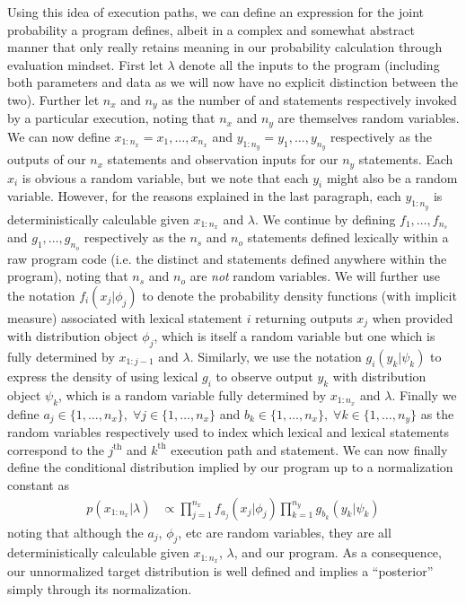 Using this idea of execution paths, we can define an expression for the joint probability a program defines,
albeit in a complex and somewhat abstract manner that only really retains meaning in our probability calculation through
evaluation mindset.  First let $\lambda$ denote all the inputs to the program (including both parameters and
data as we will now have no explicit distinction between the two).  Further let
$n_x$ and $n_y$ as the number of \sample and \observe statements
respectively invoked by a particular execution, noting that $n_x$ and $n_y$ are themselves random variables.
We can now define $x_{1:n_x} = x_1,\dots,x_{n_x}$ and $y_{1:n_y} = y_1,\dots,y_{n_y}$ respectively as the
outputs of our $n_x$ \sample statements and observation inputs for our $n_y$ \observe statements.
Each $x_{i}$ is obvious a random variable, but we note that each $y_i$ might also be a random variable.  However,
for the reasons explained in the last paragraph, each $y_{1:n_y}$ is deterministically calculable given $x_{1:n_x}$ and
$\lambda$.
We continue by defining $f_{1},\dots,f_{n_s}$ and $g_{1},\dots,g_{n_o}$ respectively as the $n_s$ \sample 
and $n_o$ \observe statements defined lexically within a raw program code (i.e. the distinct \sample and \observe
statements defined anywhere within the program), noting that $n_s$ and $n_o$ are \emph{not} random variables.
We will further use the notation $f_i(x_j|\phi_j)$  to denote the probability density functions
(with implicit measure) associated with lexical \sample statement $i$ returning outputs $x_j$ when provided
with distribution object $\phi_j$, which is itself a random variable but one which is fully determined by
$x_{1:j-1}$ and $\lambda$.  Similarly, we use the notation $g_i(y_k|\psi_k)$ to express the density of
using lexical \observe $g_i$ to observe output $y_k$ with distribution object $\psi_k$, which is a random
variable fully determined by $x_{1:n_x}$ and $\lambda$.  Finally we define $a_j \in \{1,\dots,n_x\}, \; 
\forall j\in\{1,\dots,n_x\}$ and $b_k \in \{1,\dots,n_x\}, \; \forall k\in\{1,\dots,n_y\}$ as the
random variables respectively used to index which lexical \sample and lexical \observe statements
correspond to the $j^{\text{th}}$ and $k^{\text{th}}$ execution path \sample and \observe statement.
We can now finally define the conditional distribution implied by our program up to a normalization constant
as
\begin{align}
\label{eq:probprog:universal-cond}
p(x_{1:n_x} | \lambda)
&\propto
\prod_{j=1}^{n_x} 
f_{a_j}(x_j | \phi_j)
\prod_{k=1}^{n_y}
g_{b_k}(y_k | \psi_k)
\end{align}
noting that although the $a_j$, $\phi_j$, etc are random variables, they are all deterministically
calculable given $x_{1:n_x}$, $\lambda$, and our program.  As a consequence, our unnormalized
target distribution is well defined and implies a ``posterior'' simply through its normalization.

